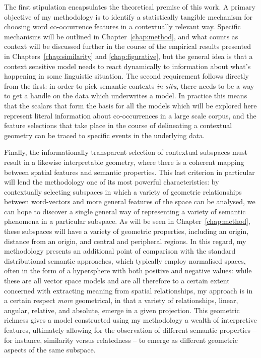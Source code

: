 The first stipulation encapsulates the theoretical premise of this work.  A primary objective of my methodology is to identify a statistically tangible mechanism for choosing word co-occurrence features in a contextually relevant way.  Specific mechanisms will be outlined in Chapter~\ref{chap:method}, and what counts as context will be discussed further in the course of the empirical results presented in Chapters~\ref{chap:similarity} and \ref{chap:figurative}, but the general idea is that a context sensitive model needs to react dynamically to information about what's happening in some linguistic situation.  The second requirement follows directly from the first: in order to pick semantic contexts \emph{in situ}, there needs to be a way to get a handle on the data which underwrites a model.  In practice this means that the scalars that form the basis for all the models which will be explored here represent literal information about co-occurrences in a large scale corpus, and the feature selections that take place in the course of delineating a contextual geometry can be traced to specific events in the underlying data.

Finally, the informationally transparent selection of contextual subspaces must result in a likewise interpretable geometry, where there is a coherent mapping between spatial features and semantic properties.  This last criterion in particular will lend the methodology one of its most powerful characteristics: by contextually selecting subspaces in which a variety of geometric relationships between word-vectors and more general features of the space can be analysed, we can hope to discover a single general way of representing a variety of semantic phenomena in a particular subspace.  As will be seen in Chapter~\ref{chap:method}, these subspaces will have a variety of geometric properties, including an origin, distance from an origin, and central and peripheral regions.  In this regard, my methodology presents an additional point of comparison with the standard distributional semantic approaches, which typically employ normalised spaces, often in the form of a hypersphere with both positive and negative values: while these are all vector space models and are all therefore to a certain extent concerned with extracting meaning from spatial relationships, my approach is in a certain respect \emph{more} geometrical, in that a variety of relationships, linear, angular, relative, and absolute, emerge in a given projection.  This geometric richness gives a model constructed using my methodology a wealth of interpretive features, ultimately allowing for the observation of different semantic properties -- for instance, similarity versus relatedness -- to emerge as different geometric aspects of the same subspace.

